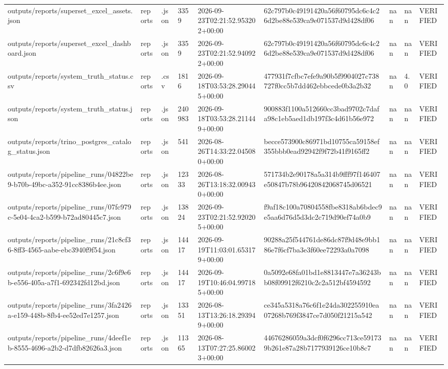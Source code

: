 \begin{longtable}{lllllllll}
outputs/reports/superset_excel_assets.json & reports & .json & 3359 & 2026-09-23T02:21:52.953202+00:00 & 62c797b0c49191420a56f60795dc6c4c26d2be88e539ca9e071537d9d428df06 & nan & nan & VERIFIED \\
outputs/reports/superset_excel_dashboard.json & reports & .json & 3359 & 2026-09-23T02:21:52.940922+00:00 & 62c797b0c49191420a56f60795dc6c4c26d2be88e539ca9e071537d9d428df06 & nan & nan & VERIFIED \\
outputs/reports/system_truth_status.csv & reports & .csv & 1816 & 2026-09-18T03:53:28.290445+00:00 & 477931f7cfbc7efe9a90b5f9904027c738727f0cc5b7dd462ebbcede0b3a2b32 & nan & 4.0 & VERIFIED \\
outputs/reports/system_truth_status.json & reports & .json & 240983 & 2026-09-18T03:53:28.211449+00:00 & 900883f1100a512660cc3bad9702c7dafa98c1eb5aed1db197f3c4d61b56e972 & nan & nan & VERIFIED \\
outputs/reports/trino_postgres_catalog_status.json & reports & .json & 541 & 2026-08-26T14:33:22.045080+00:00 & becce573900c86971bd10755ca59158ef355bbb0ead92942f9f72b41f9165ff2 & nan & nan & VERIFIED \\
outputs/reports/pipeline_runs/04822be9-b70b-49bc-a352-91cc8386b4ee.json & reports & .json & 12333 & 2026-08-26T13:18:32.009430+00:00 & 571734b2e90178a5a314b9fff97f146407e50847b78b96420842068745d06521 & nan & nan & VERIFIED \\
outputs/reports/pipeline_runs/07fc979c-5e04-4ca2-b599-b72ad80445c7.json & reports & .json & 13824 & 2026-09-23T02:21:52.920205+00:00 & f9af18c100a70804558fbe8318ab6bdec9e5aa6d76d5d3dc2c719d90ef74a0b9 & nan & nan & VERIFIED \\
outputs/reports/pipeline_runs/21c8cf36-8ff3-4565-aabe-ebc3940f9f54.json & reports & .json & 14417 & 2026-09-19T11:03:01.653179+00:00 & 90288a25f544761de86dc87f9d48e9bb186e7f6cf7ba3e3f60ee72293a0a7098 & nan & nan & VERIFIED \\
outputs/reports/pipeline_runs/2c6f9e6b-e556-405a-a7f1-692342fd12bd.json & reports & .json & 14417 & 2026-09-19T10:46:04.997185+00:00 & 0a5092e68fa01bd1e8813447e7a36243bb08f09912f6210c2c2a512bf4594592 & nan & nan & VERIFIED \\
outputs/reports/pipeline_runs/3fa2426a-e159-448b-8fb4-ee52ed7e1257.json & reports & .json & 13351 & 2026-08-13T13:26:18.293949+00:00 & ce345a5318a76c6f1e24da302255910ea07268b769f3847ce7d050f21215a542 & nan & nan & VERIFIED \\
outputs/reports/pipeline_runs/4deef1eb-8555-4696-a2b2-d7dfb82626a3.json & reports & .json & 11365 & 2026-08-13T07:27:25.860023+00:00 & 44676286059a3dcf0f6296cc713ce591739b261e87a28b7177939126ce10b8c7 & nan & nan & VERIFIED \\

\end{longtable}

